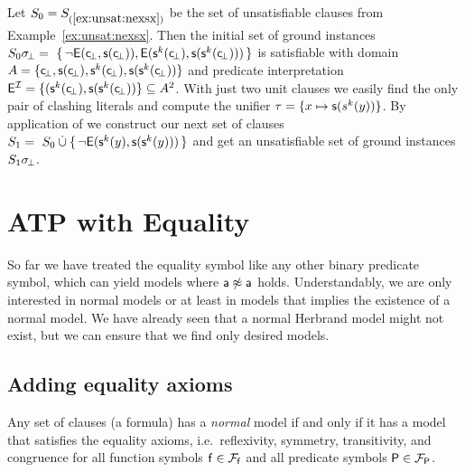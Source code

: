 \begin{example}\label{ex:unsat2}
Let \( S_0 = S_{(\ref{ex:unsat:nexsx})} \) be the set of unsatisfiable clauses
from Example~\ref{ex:unsat:nexsx}.
Then the initial set of ground instances
\( S_0\sigma \!_\bot =\
 \{ \,
{ \lnot\mathsf{E}(\mathsf{c} \!_\bot, \mathsf{s}(\mathsf{c} \!_\bot)) },
{ \mathsf{E}(\mathsf{s}^k(\mathsf{c} \!_\bot), \mathsf{s}(\mathsf{s}^k(\mathsf{c} \!_\bot)))}
 \, \} \)
is satisfiable with domain
\( A = \{ \mathsf{c} \!_\bot, \mathsf{s}(\mathsf{c} \!_\bot), \mathsf{s}^k(\mathsf{c} \!_\bot), \mathsf{s}(\mathsf{s}^k(\mathsf{c} \!_\bot)) \} \)
and predicate interpretation
\( \mathsf{E}^{\mathcal{I}} = \{ (\mathsf{s}^k(\mathsf{c} \!_\bot), \mathsf{s}(\mathsf{s}^k(\mathsf{c} \!_\bot)) \} \subseteq A^2 \).
%
 With just two unit clauses we easily find the only pair of clashing literals and compute the unifier
 \( \tau = \{ x\mapsto \mathsf{s}(s^k(y)) \} \).
 By application of \InstGen{} we construct our next set of clauses
\( S_1 =\
S_0 \mathbin{\dot\cup}
 \{ \,
 { \lnot\mathsf{E}(\mathsf{s}^k(y), \mathsf{s}(\mathsf{s}^k(y)))}
 \, \}
 \)
 and get an unsatisfiable set of ground instances \( S_1\sigma \!_\bot \).
\end{example}




\section{ATP with Equality}\label{sec:proving:with:equality}

So far we have treated the equality symbol like any other binary predicate symbol,
which can yield models where \( \mathsf{a}\not\approx\mathsf{a} \) holds.
Understandably, we are only interested in normal models or
at least in models that implies the existence of a normal model.
We have already seen that a normal Herbrand model might not exist,
but we can ensure that we find only desired models.

\subsection{Adding equality axioms}\label{sec:equality:axioms}

\begin{theorem}\cite{Harrison:2009:HPL:1540610}
	Any set of clauses (a formula) has a \emph{normal} model
	if and only if it has a model that satisfies the
	{ \coloremph{}equality axioms}, i.e.~reflexivity, symmetry, transitivity,
	and congruence for all function symbols \( \mathsf{f}\in{\mathcal{F}_{\mathsf{f}}} \)
	and all predicate symbols \( \mathsf{P}\in{\mathcal{F}_{\mathsf{P}}} \).
\end{theorem}


